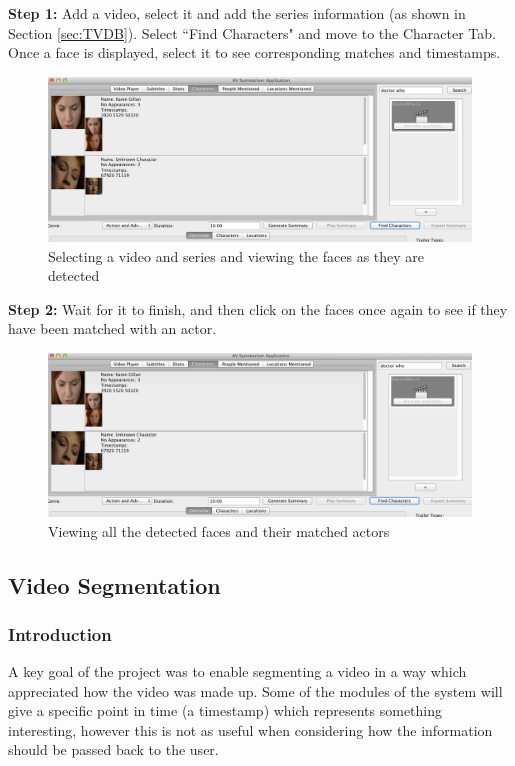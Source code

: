 \textbf{Step 1:} Add a video, select it and add the series information (as shown in Section \ref{sec:TVDB}). Select ``Find Characters" and move to the Character Tab. Once a face is displayed, select it to see corresponding matches and timestamps. 
\begin{figure}[ht]
\begin{center}
 \includegraphics[scale=0.31]{Images/FaceWalkthrough1.png}
  \caption{Selecting a video and series and viewing the faces as they are detected}
 \end{center}
\end{figure}

\textbf{Step 2:} Wait for it to finish, and then click on the faces once again to see if they have been matched with an actor. 
\begin{figure}[ht]
\begin{center}
 \includegraphics[scale=0.31]{Images/FaceWalkthrough2.png}
  \caption{Viewing all the detected faces and their matched actors}
 \end{center}
\end{figure}

\newpage

\subsection{Video Segmentation} 
\label{sec:VideoSeg}
\subsubsection{Introduction}
A key goal of the project was to enable segmenting a video in a way which appreciated
how the video was made up. Some of the modules of the system will give a specific point
in time (a timestamp) which represents something interesting, however this is not as useful
when considering how the information should be passed back to the user.

